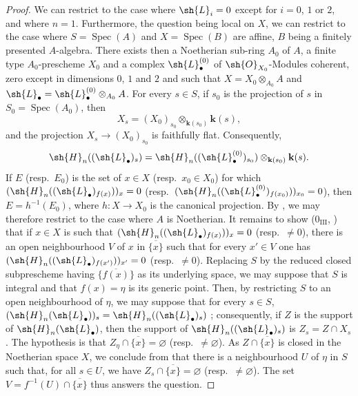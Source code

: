 \begin{proof}
\label{IV.9.9.6-proof}
We can restrict to the case where $\sh{L}_i=0$ except for $i=0$, $1$ or $2$, and where $n=1$.
Furthermore, the question being local on $X$, we can restrict to the case where $S=\operatorname{Spec}(A)$ and $X=\operatorname{Spec}(B)$ are affine, $B$ being a finitely presented $A$-algebra.
There exists then a Noetherian sub-ring $A_0$ of $A$, a finite type $A_0$-prescheme $X_0$ and a complex $\sh{L}_\bullet^{(0)}$ of $\sh{O}_{X_0}$-Modules coherent, zero except in dimensions $0$, $1$ and $2$ and such that $X=X_0\otimes_{A_0}A$ and $\sh{L}_\bullet=\sh{L}_\bullet^{(0)}\otimes_{A_0}A$.
For every $s\in S$, if $s_0$ is the projection of $s$ in $S_0=\operatorname{Spec}(A_0)$, then
\[
  X_s=(X_0)_{s_0}\otimes_{\mathbf{k}(s_0)}\mathbf{k}(s),
\]
and the projection $X_s\to(X_0)_{s_0}$ is faithfully flat.
Consequently,
\[
  \sh{H}_n((\sh{L}_\bullet)_s)
  =\sh{H}_n((\sh{L}_\bullet^{(0)})_{s_0})\otimes_{\mathbf{k}(s_0)}\mathbf{k}(s).
\]
If $E$ (resp.~$E_0$) is the set of $x\in X$ (resp.~$x_0\in X_0$) for which $(\sh{H}_n((\sh{L}_\bullet)_{f(x)}))_x=0$ (resp.~$(\sh{H}_n((\sh{L}_\bullet^{(0)})_{f(x_0)}))_{x_0}=0$), then $E=h^{-1}(E_0)$, where $h:X\to X_0$ is the canonical projection.
By , we may therefore restrict to the case where $A$ is Noetherian.
It remains to show ($0_{\mathrm{III}}$, ) that if $x\in X$ is such that $(\sh{H}_n((\sh{L}_\bullet)_{f(x)}))_x=0$ (resp.~$\neq 0$), there is an open neighbourhood $V$ of $x$ in $\overline{\{x\}}$ such that for every $x'\in V$ one has $(\sh{H}_n((\sh{L}_\bullet)_{f(x')}))_{x'}=0$ (resp.~$\neq 0$).
Replacing $S$ by the reduced closed subprescheme having $\overline{\{f(x)\}}$ as its underlying space, we may suppose that $S$ is integral and that $f(x)=\eta$ is its generic point.
Then, by restricting $S$ to an open neighbourhood of $\eta$, we may suppose that for every $s\in S$,
$(\sh{H}_n(\sh{L}_\bullet))_s=\sh{H}_n((\sh{L}_\bullet)_s)$ ; consequently, if $Z$ is the support of $\sh{H}_n(\sh{L}_\bullet)$, then the support of $\sh{H}_n((\sh{L}_\bullet)_s)$ is $Z_s=Z\cap X_s$ .
The hypothesis is that $Z_\eta\cap\overline{\{x\}}=\varnothing$ (resp.~$\neq\varnothing$).
As $Z\cap\overline{\{x\}}$ is closed in the Noetherian space $X$, we conclude from  that there is a neighbourhood $U$ of $\eta$ in $S$ such that, for all $s\in U$, we have $Z_s\cap\overline{\{x\}}=\varnothing$ (resp.~$\neq\varnothing$).
The set $V=f^{-1}(U)\cap\overline{\{x\}}$ thus answers the question.
\end{proof}
